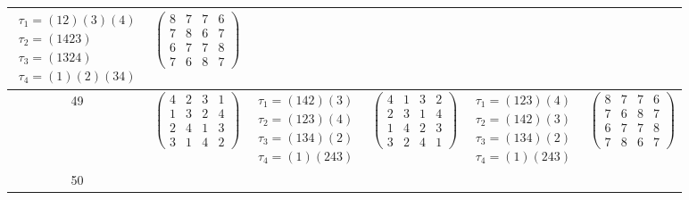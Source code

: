 \begin{longtable}{|c|p{2.7cm}|p{2.7cm}|p{2.7cm}|p{2.7cm}|p{2.7cm}|}
    $\begin{array}{l}\tau_{1}=(12)(3)(4)\\ \tau_{2}=(1423)\\ \tau_{3}=(1324)\\ \tau_{4}=(1)(2)(34)\end{array}$     &
    $\begin{pmatrix} 8 & 7 & 7 & 6 \\ 7 & 8 & 6 & 7 \\ 6 & 7 & 7 & 8 \\ 7 & 6 & 8 & 7 \end{pmatrix}$                                                                                           \\
    \hline
    49                                                                                                             &
    $\begin{pmatrix} 4 & 2 & 3 & 1 \\ 1 & 3 & 2 & 4 \\ 2 & 4 & 1 & 3 \\ 3 & 1 & 4 & 2 \end{pmatrix}$               &
    $\begin{array}{l}\tau_{1}=(142)(3)\\ \tau_{2}=(123)(4)\\ \tau_{3}=(134)(2)\\ \tau_{4}=(1)(243)\end{array}$     &
    $\begin{pmatrix} 4 & 1 & 3 & 2 \\ 2 & 3 & 1 & 4 \\ 1 & 4 & 2 & 3 \\ 3 & 2 & 4 & 1 \end{pmatrix}$               &
    $\begin{array}{l}\tau_{1}=(123)(4)\\ \tau_{2}=(142)(3)\\ \tau_{3}=(134)(2)\\ \tau_{4}=(1)(243)\end{array}$     &
    $\begin{pmatrix} 8 & 7 & 7 & 6 \\ 7 & 6 & 8 & 7 \\ 6 & 7 & 7 & 8 \\ 7 & 8 & 6 & 7 \end{pmatrix}$                                                                                           \\
    \hline
    50                                                                                                             &

\end{longtable}
